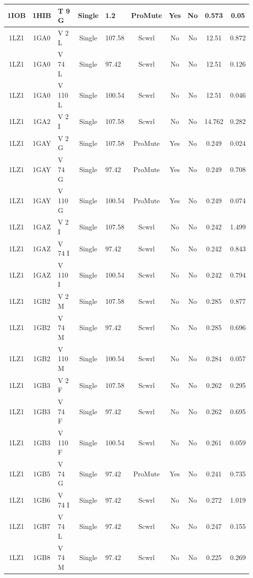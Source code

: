 \documentclass[sigconf]{acmart}
\begin{document}
\begin{table}[h]
{\begin{tabular}{|c|c|p{2.8cm}|c|p{2.8cm}|c|c|c|c|c|}
		1IOB & 1HIB & T 9 G & Single & 1.2 & ProMute & Yes & No & 0.573 & 0.05 \\ \hline
		1LZ1 & 1GA0 & V 2 L & Single & 107.58 & Scwrl & No & No & 12.51 & 0.872 \\ \hline
		1LZ1 & 1GA0 & V 74 L & Single & 97.42 & Scwrl & No & No & 12.51 & 0.126 \\ \hline
		1LZ1 & 1GA0 & V 110 L & Single & 100.54 & Scwrl & No & No & 12.51 & 0.046 \\ \hline
		1LZ1 & 1GA2 & V 2 I & Single & 107.58 & Scwrl & No & No & 14.762 & 0.282 \\ \hline
		1LZ1 & 1GAY & V 2 G & Single & 107.58 & ProMute & Yes & No & 0.249 & 0.024 \\ \hline
		1LZ1 & 1GAY & V 74 G & Single & 97.42 & ProMute & Yes & No & 0.249 & 0.708 \\ \hline
		1LZ1 & 1GAY & V 110 G & Single & 100.54 & ProMute & Yes & No & 0.249 & 0.074 \\ \hline
		1LZ1 & 1GAZ & V 2 I & Single & 107.58 & Scwrl & No & No & 0.242 & 1.499 \\ \hline
		1LZ1 & 1GAZ & V 74 I & Single & 97.42 & Scwrl & No & No & 0.242 & 0.843 \\ \hline
		1LZ1 & 1GAZ & V 110 I & Single & 100.54 & Scwrl & No & No & 0.242 & 0.794 \\ \hline
		1LZ1 & 1GB2 & V 2 M & Single & 107.58 & Scwrl & No & No & 0.285 & 0.877 \\ \hline
		1LZ1 & 1GB2 & V 74 M & Single & 97.42 & Scwrl & No & No & 0.285 & 0.696 \\ \hline
		1LZ1 & 1GB2 & V 110 M & Single & 100.54 & Scwrl & No & No & 0.284 & 0.057 \\ \hline
		1LZ1 & 1GB3 & V 2 F & Single & 107.58 & Scwrl & No & No & 0.262 & 0.295 \\ \hline
		1LZ1 & 1GB3 & V 74 F & Single & 97.42 & Scwrl & No & No & 0.262 & 0.695 \\ \hline
		1LZ1 & 1GB3 & V 110 F & Single & 100.54 & Scwrl & No & No & 0.261 & 0.059 \\ \hline
		1LZ1 & 1GB5 & V 74 G & Single & 97.42 & ProMute & Yes & No & 0.241 & 0.735 \\ \hline
		1LZ1 & 1GB6 & V 74 I & Single & 97.42 & Scwrl & No & No & 0.272 & 1.019 \\ \hline
		1LZ1 & 1GB7 & V 74 L & Single & 97.42 & Scwrl & No & No & 0.247 & 0.155 \\ \hline
		1LZ1 & 1GB8 & V 74 M & Single & 97.42 & Scwrl & No & No & 0.225 & 0.269 \\ \hline

\end{tabular}}
\end{table}
\end{document}
